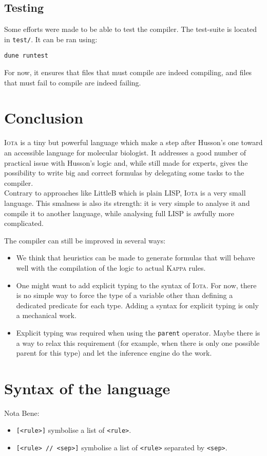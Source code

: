 \documentclass[10pt,a4paper]{article}
\newcommand\Iota{\textsc{Iota}}
\newcommand\Kappa{\textsc{Kappa}}
\newcommand{\ocaml}{\texttt}
\begin{document}
\subsection{Testing}
Some efforts were made to be able to test the compiler. The test-suite is located in \verb|test/|. It can be ran using:
\begin{verbatim}
dune runtest
\end{verbatim}
For now, it ensures that files that must compile are indeed compiling, and files that must fail to compile are indeed failing.

\section{Conclusion}
\Iota{} is a tiny but powerful language which make a step after Husson's one toward an accessible language for molecular biologist. It addresses a good number of practical issue with Husson's logic and, while still made for experts, gives the possibility to write big and correct formulas by delegating some tasks to the compiler.\\

Contrary to approaches like LittleB \cite{littleb} which is plain LISP, \Iota{} is a very small language. This smalness is also its strength: it is very simple to analyse it and compile it to another language, while analysing full LISP is awfully more complicated.

The compiler can still be improved in several ways:
\begin{itemize}
\item We think that heuristics can be made to generate formulas that will behave well with the compilation of the logic to actual \Kappa{} rules.
\item One might want to add explicit typing to the syntax of \Iota{}. For now, there is no simple way to force the type of a variable other than defining a dedicated predicate for each type. Adding a syntax for explicit typing is only a mechanical work.
\item Explicit typing was required when using the \ocaml{parent} operator. Maybe there is a way to relax this requirement (for example, when there is only one possible parent for this type) and let the inference engine do the work.
\end{itemize}

\section{Syntax of the language}
Nota Bene:
\begin{itemize}
\item \verb|[<rule>]| symbolise a list of \verb|<rule>|.
\item \verb|[<rule> // <sep>]| symbolise a list of \verb|<rule>| separated by \verb|<sep>|.
\end{itemize}
\end{document}

